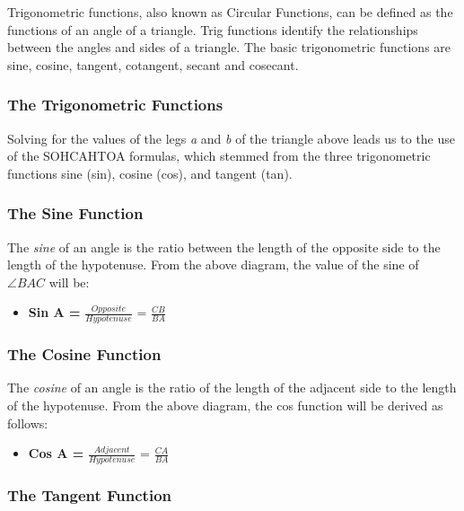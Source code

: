 \documentclass[
  letterpaper,
  DIV=11,
  numbers=noendperiod]{scrartcl}
\providecommand{\tightlist}{%
  \setlength{\itemsep}{0pt}\setlength{\parskip}{0pt}}\usepackage{longtable,booktabs,array}
\begin{document}
Trigonometric functions, also known as Circular Functions, can be
defined as the functions of an angle of a triangle. Trig functions
identify the relationships between the angles and sides of a triangle.
The basic trigonometric functions are sine, cosine, tangent, cotangent,
secant and cosecant.

\subsubsection{The Trigonometric
Functions}\label{the-trigonometric-functions}

Solving for the values of the legs \emph{a} and \emph{b} of the triangle
above leads us to the use of the SOHCAHTOA formulas, which stemmed from
the three trigonometric functions sine (sin), cosine (cos), and tangent
(tan).

\subsubsection{The Sine Function}\label{the-sine-function}

The \emph{sine} of an angle is the ratio between the length of the
opposite side to the length of the hypotenuse. From the above diagram,
the value of the sine of \(\angle BAC\) will be:

\begin{itemize}
\tightlist
\item
  \textbf{Sin A =} \(\frac{Opposite}{Hypotenuse}\) = \(\frac{CB}{BA}\)
\end{itemize}

\subsubsection{The Cosine Function}\label{the-cosine-function}

The \emph{cosine} of an angle is the ratio of the length of the adjacent
side to the length of the hypotenuse. From the above diagram, the cos
function will be derived as follows:

\begin{itemize}
\tightlist
\item
  \textbf{Cos A =} \(\frac{Adjacent}{Hypotenuse}\) = \(\frac{CA}{BA}\)
\end{itemize}

\subsubsection{The Tangent Function}\label{the-tangent-function}
\end{document}
